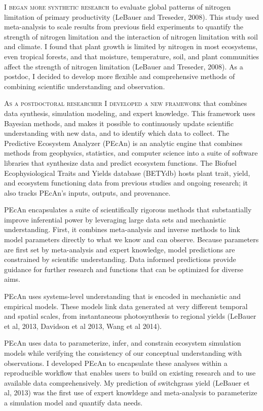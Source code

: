 \documentclass[english]{tufte-handout}
\providecommand\mynewthought[1]{%
   \addvspace{0.5em}%
   \noindent\hspace{-0.5em}\textsc{#1} %
}
\begin{document}
\begin{fullwidth}
\mynewthought{I began more synthetic research} to evaluate global patterns of nitrogen limitation of primary productivity (LeBauer and Treseder, 2008). 
 This study used meta-analysis to scale results from previous field experiments to quantify the strength of nitrogen limitation and the interaction of nitrogen limitation with soil and climate.
 I found that plant growth is limited by nitrogen in most ecosystems, even tropical forests, and that moisture, temperature, soil, and plant communities affect the strength of nitrogen limitation (LeBauer and Treseder, 2008).
 As a postdoc, I decided to develop more flexible and comprehensive methods of combining scientific understanding and observation.

 \mynewthought{As a postdoctoral researcher I developed a new framework} that combines data synthesis, simulation modeling, and expert knowledge.
 This framework uses Bayesian methods, and makes it possible to continuously update scientific understanding with new data, and to identify which data to collect.
 The Predictive Ecosystem Analyzer (PEcAn) is an analytic engine that combines methods from geophysics, statistics, and computer science into a suite of software libraries that synthesize data and predict ecosystem functions.
 The Biofuel Ecophysiological Traits and Yields database (BETYdb) hosts plant trait, yield, and ecosystem functioning data from previous studies and ongoing research; it also tracks PEcAn's inputs, outputs, and provenance. 

 PEcAn encapsulates a suite of scientifically rigorous methods that substantially improve inferential power by leveraging large data sets and mechanistic understanding.
 First, it combines meta-analysis and inverse methods to link model parameters directly to what we know and can observe.
 Because parameters are first set by meta-analysis and expert knowledge, model predictions are constrained by scientific understanding. 
 Data informed predictions provide guidance for further research and functions that can be optimized for diverse aims.

  PEcAn uses systems-level understanding that is encoded in mechanistic and empirical models. 
  These models link data generated at very different temporal and spatial scales, from instantaneous photosynthesis to regional yields (LeBauer et al, 2013, Davidson et al 2013, Wang et al 2014).
  
  PEcAn uses data to parameterize, infer, and constrain ecosystem simulation models while verifying the consistency of our conceptual understanding with observations.
  I developed PEcAn to encapsulate these analyses within a reproducible workflow that enables users to build on existing research and to use available data comprehensively.
  My prediction of switchgrass yield (LeBauer et al, 2013) was the first use of expert knowldege and meta-analysis to parameterize a simulation model and quantify data needs. 


\end{fullwidth}
\end{document}
